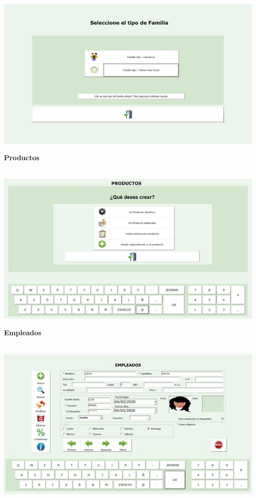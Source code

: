 \documentclass[12pt,a4paper]{article}
\begin{document}
\begin{center}
 \includegraphics[scale=0.7]{3.jpg} 
 \end{center}
 \par\vspace{6cm}
\textbf {Productos}\\\\
\begin{center}
 \includegraphics[scale=0.7]{4.jpg} 
 \end{center}
 \par\vspace{0.5cm}
\textbf {Empleados}\\\\
\begin{center}
 \includegraphics[scale=0.7]{5.jpg} 
 \end{center}
\end{document}
